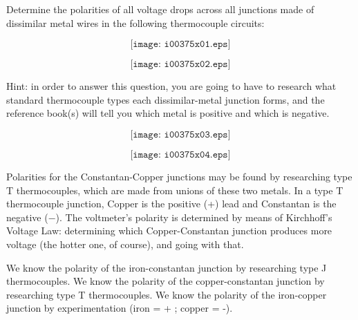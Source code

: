 

Determine the polarities of all voltage drops across all junctions made of dissimilar metal wires in the following thermocouple circuits:

$$\texttt{[image: i00375x01.eps]}$$

$$\texttt{[image: i00375x02.eps]}$$







Hint: in order to answer this question, you are going to have to research what standard thermocouple types each dissimilar-metal junction forms, and the reference book(s) will tell you which metal is positive and which is negative.

$$\texttt{[image: i00375x03.eps]}$$

$$\texttt{[image: i00375x04.eps]}$$








Polarities for the Constantan-Copper junctions may be found by researching type T thermocouples, which are made from unions of these two metals.  In a type T thermocouple junction, Copper is the positive (+) lead and Constantan is the negative ($-$).  The voltmeter's polarity is determined by means of Kirchhoff's Voltage Law: determining which Copper-Constantan junction produces more voltage (the hotter one, of course), and going with that.

We know the polarity of the iron-constantan junction by researching type J thermocouples.  We know the polarity of the copper-constantan junction by researching type T thermocouples.  We know the polarity of the iron-copper junction by experimentation (iron = + ; copper = -).




